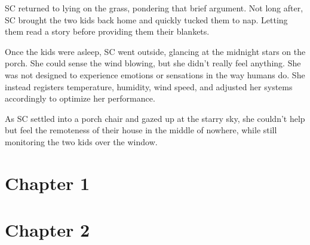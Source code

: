 \documentclass[12pt]{book}
\begin{document}
\clearpage

SC returned to lying on the grass, pondering that brief
argument. Not long after, SC brought the two kids back
home and quickly tucked them to nap. Letting them read a
story before providing them their blankets.

Once the kids were asleep, SC went outside, glancing at
the midnight stars on the porch. She could sense the wind
blowing, but she didn't really feel anything. She was not
designed to experience emotions or sensations in the way
humans do. She instead registers temperature, humidity,
wind speed, and adjusted her systems accordingly to
optimize her performance.

As SC settled into a porch chair and gazed up at the
starry sky, she couldn't help but feel the remoteness of
their house in the middle of nowhere, while still
monitoring the two kids over the window.

\section*{Chapter 1}

\section*{Chapter 2}
\end{document}
